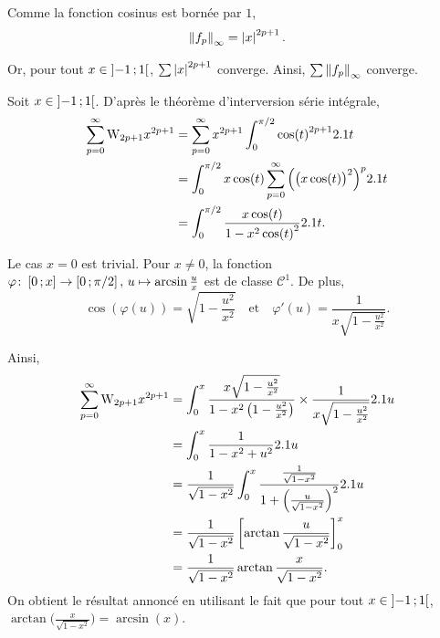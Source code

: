 \begin{solution}
\begin{reponses}
\item Comme la fonction cosinus est bornée par $1$,
\[
\norm{f_p}_{\infty} = \module{x}^{2p+1}.
\]

Or, pour tout $x \in \interoo{-1}{1}$, $\sum \module{x}^{2p+1}$ converge. Ainsi, $\sum \norm{f_p}_{\infty}$ converge.

\item Soit $x \in \interoo{-1}{1}$. D'après le théorème d'interversion série intégrale,
\begin{align*}
\sum_{p=0}^\infty \Wallis_{2p+1} x^{2p+1}
&= \sum_{p=0}^\infty x^{2p+1} \int_0^{\pi/2} \cos(t)^{2p+1} \d t\\
&= \int_0^{\pi/2} x\cos(t) \sum_{p=0}^\infty \Big(\big(x\cos(t) \big)^2 \Big)^p \d t \\
&= \int_0^{\pi/2} \frac{x \cos(t)}{1 - x^2 \cos(t)^2} \d t.
\end{align*}

\item Le cas $x = 0$ est trivial. Pour $x \neq 0$, la fonction $\fonctionens[\varphi]{\interff{0}{x}}{\interff{0}{\pi/2}},\, u \mapsto \arcsin\frac{u}{x}$ est de classe $\mathscr{C}^1$. De plus,
\[
\cos(\varphi(u)) = \sqrt{1 - \frac{u^2}{x^2}}
\quad \text{et} \quad 
\varphi'(u) = \frac{1}{x \sqrt{1 - \frac{u^2}{x^2}}}.
\]

Ainsi,
\begin{align*}
\sum_{p=0}^\infty \Wallis_{2p+1} x^{2p+1}
&= \int_0^x \frac{x \sqrt{1 - \frac{u^2}{x^2}}}{1 - x^2 \left(1 - \frac{u^2}{x^2}\right)} \times \frac{1}{x \sqrt{1 - \frac{u^2}{x^2}}}\d u \\
&= \int_0^x \frac{1}{1 - x^2 + u^2} \d u\\
&= \frac{1}{\sqrt{1 - x^2}} \int_0^x \frac{\frac{1}{\sqrt{1 - x^2}}}{1 + \left(\frac{u}{\sqrt{1-x^2}}\right)^2} \d u \\
&= \frac{1}{\sqrt{1 - x^2}} \left[ \arctan \frac{u}{\sqrt{1 - x^2}} \right]^x_0 \\
&= \frac{1}{\sqrt{1 - x^2}} \arctan \frac{x}{\sqrt{1 - x^2}}.
\end{align*}
On obtient le résultat annoncé en utilisant le fait que pour tout $x \in \interoo{-1}{1}$, $\arctan\mathopen{}\Big(\frac{x}{\sqrt{1-x^2}} \Big) = \arcsin(x)$.


\end{reponses}
\end{solution}
